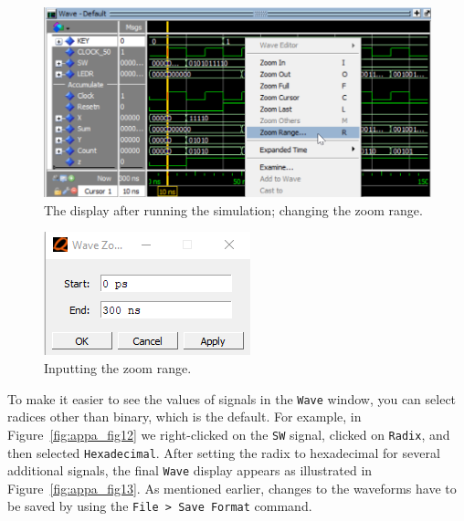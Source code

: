 \documentclass[11pt, twoside, pdftex]{article}
\begin{document}
\begin{figure}[h!]
	\begin{center}
		\includegraphics[scale=0.8]{figures/appa_fig10.png}
	\end{center}
		  \caption{The display after running the simulation; changing the zoom range.}
	\label{fig:appa_fig10}
\end{figure}

\begin{figure}[h!]
	\begin{center}
		\includegraphics[scale=0.8]{figures/appa_fig11.png}
	\end{center}
		  \caption{Inputting the zoom range.}
	\label{fig:appa_fig11}
\end{figure}

\noindent
To make it easier to see the values of signals in the \texttt{Wave} window, you can select
radices other than binary, which is the default. For example, in
Figure~\ref{fig:appa_fig12} we right-clicked on the \texttt{SW} signal, clicked on
\texttt{Radix}, and then selected \texttt{Hexadecimal}. After setting the radix to
hexadecimal for several additional signals, the final \texttt{Wave} display appears as
illustrated in Figure~\ref{fig:appa_fig13}.
As mentioned earlier, changes to the waveforms
have to be saved by using the \texttt{File > Save Format} command.
\end{document}
